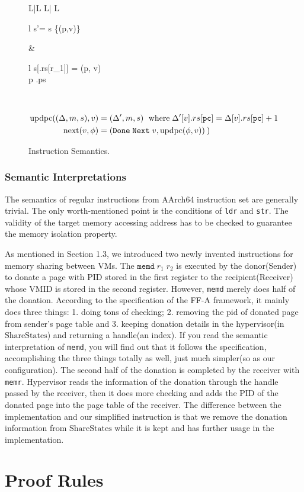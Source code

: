 \documentclass[a4paper]{article}
\newcommand*{\SSS}{\text{ShareStates}}
\newcommand*{\PID}{\text{PID}}
\newcommand*{\VMID}{\text{VMID}}
\newcommand*{\instr}[1]{\texttt{#1}}
\newcommand*{\updpc}{\text{updpc}}
\begin{document}
\begin{figure}[h!]
\begin{adjustwidth}{-1cm}{}
\begin{tabular}[t]{L|L L| L}
\begin{array}{l}
                                      s'= s \setminus \{(p,v)\}
                                    \end{array}
                       &\leftshift\begin{array}{l}
                                       s[\Delta[v].rs[r_{1}]] = (p, v)\\
                                       \land p \notin \Delta[v].ps
                        \end{array} \\\hline
  \end{tabular}
  \end{adjustwidth}
\begin{align*}
  \updpc((\Delta,m,s),v)&=(\Delta',m,s)\ \; \text{where}\; \Delta'[v].rs[\mathtt{pc}] = \Delta[v].rs[\mathtt{pc}]+1\\
     \nextt(v,\phi) &= \DNXT{v}{\phi}
\end{align*}
\caption{Instruction Semantics.}
\end{figure}
\subsubsection{Semantic Interpretations}
The semantics of regular instructions from AArch64 instruction set are generally
trivial. The only worth-mentioned point is the conditions of \instr{ldr} and
\instr{str}. The validity of the target memory accessing address has to be
checked to guarantee the memory isolation property.

As mentioned in Section 1.3, we introduced two newly invented instructions for
memory sharing between VMs. The $\instr{memd}\; r_{1}\; r_{2}$ is executed by
the donor(Sender) to donate a page with $\PID$ stored in the first register to
the recipient(Receiver) whose $\VMID$ is stored in the second register. However,
\instr{memd} merely does half of the donation. According to the specification of the
FF-A framework, it mainly does three things: 1. doing tons of
checking; 2. removing the pid of donated page from sender's page table and 3.
keeping donation details in the hypervisor(in $\SSS$) and returning a handle(an
index). If you read the semantic interpretation of \instr{memd}, you will find
out that it follows the specification, accomplishing the three things totally as
well, just much simpler(so as our configuration). The second half of the
donation is completed by the receiver with \instr{memr}. Hypervisor reads the
information of the donation through the handle passed by the receiver, then it
does more checking and adds the $\PID$ of the donated page into the page table
of the receiver. The difference between the implementation and our simplified
instruction is that we remove the donation information from $\SSS$ while it is
kept and has further usage in the implementation.

\section{Proof Rules}
\end{document}
